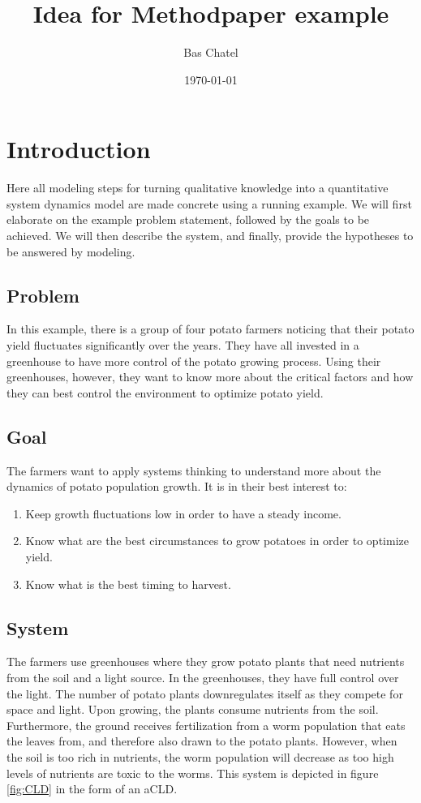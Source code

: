 \documentclass[a4paper]{article}
\author{Bas Chatel}
\date{\today}
\title{Idea for Methodpaper example}
\begin{document}
\maketitle

\section*{Introduction}
\label{sec:org4896f3c}
Here all modeling steps for turning qualitative knowledge into a quantitative system dynamics model are made concrete using a running example. We will first elaborate on the example problem statement, followed by the goals to be achieved. We will then describe the system, and finally, provide the hypotheses to be answered by modeling.

\subsection*{Problem}
\label{sec:orgbf646b5}
In this example, there is a group of four potato farmers noticing that their potato yield fluctuates significantly over the years. They have all invested in a greenhouse to have more control of the potato growing process. Using their greenhouses, however, they want to know more about the critical factors and how they can best control the environment to optimize potato yield.

\subsection*{Goal}
\label{sec:orgb987275}
The farmers want to apply systems thinking to understand more about the dynamics of potato population growth. It is in their best interest to:

\begin{enumerate}
\item Keep growth fluctuations low in order to have a steady income.
\item Know what are the best circumstances to grow potatoes in order to optimize yield.
\item Know what is the best timing to harvest.
\end{enumerate}

\subsection*{System}
\label{sec:orga2e61e4}
The farmers use greenhouses where they grow potato plants that need nutrients from the soil and a light source. In the greenhouses, they have full control over the light. The number of potato plants downregulates itself as they compete for space and light. Upon growing, the plants consume nutrients from the soil. Furthermore, the ground receives fertilization from a worm population that eats the leaves from, and therefore also drawn to the potato plants. However, when the soil is too rich in nutrients, the worm population will decrease as too high levels of nutrients are toxic to the worms. This system is depicted in figure \ref{fig:CLD} in the form of an aCLD.
\end{document}
